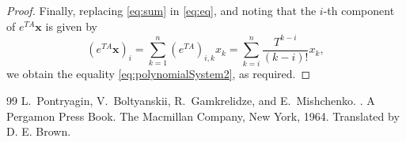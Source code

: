 \documentclass[10pt,a4paper]{amsart}
\begin{document}
\begin{proof}
 Finally, replacing \eqref{eq:sum} in \eqref{eq:eq}, and noting that the $i$-th component of $e^{TA}\bm{x}$ is given by
 \begin{equation*}
 (e^{TA}\bm{x})_i=\sum_{k=1}^{n}(e^{TA})_{i,k}{x}_k=\sum_{k=i}^{n}\frac{T^{k-i}}{(k-i)!}{x}_k,
 \end{equation*} 
 we obtain the equality \eqref{eq:polynomialSystem2}, as required.
 \end{proof}

\begin{thebibliography}{99}
 L.~Pontryagin, V.~Boltyanskii, R.~Gamkrelidze, and E.~Mishchenko. . \newblock A Pergamon Press Book. The Macmillan Company, New York, 1964. \newblock Translated by D. E. Brown.
\end{thebibliography}
\end{document}
